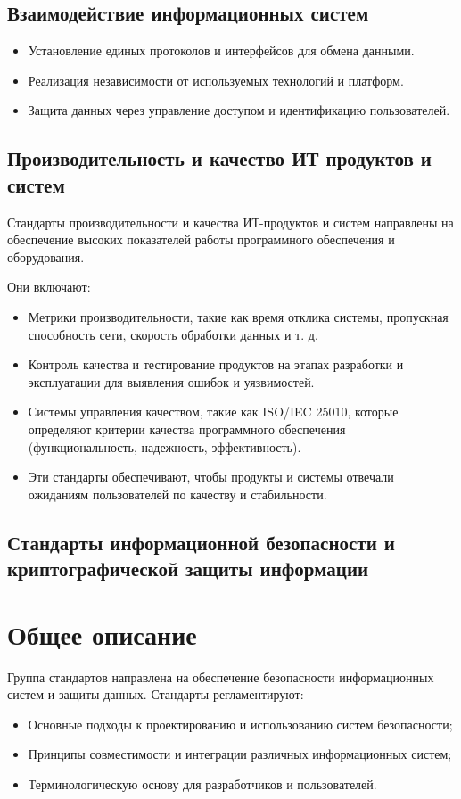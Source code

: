 \subsection*{Взаимодействие информационных систем}
\begin{itemize}
    \item Установление единых протоколов и интерфейсов для обмена данными.
    \item Реализация независимости от используемых технологий и платформ.
    \item Защита данных через управление доступом и идентификацию пользователей.
\end{itemize}
\subsection{Производительность и качество ИТ продуктов и систем}

Стандарты производительности и качества ИТ-продуктов и систем
направлены на обеспечение высоких показателей работы программного обеспечения
и оборудования.

Они включают:

\begin{itemize}
    \item Метрики производительности, такие как время отклика системы,
    пропускная способность сети, скорость обработки данных и т. д.
    \item Контроль качества и тестирование продуктов на этапах разработки
    и эксплуатации для выявления ошибок и уязвимостей.
    \item Системы управления качеством, такие как ISO/IEC 25010,
    которые определяют критерии качества программного обеспечения
    (функциональность, надежность, эффективность).
    \item Эти стандарты обеспечивают, чтобы продукты
    и системы отвечали ожиданиям пользователей по качеству и стабильности.
\end{itemize}




\subsection{Стандарты информационной безопасности и криптографической защиты информации}

\section*{Общее описание}
Группа стандартов направлена на обеспечение безопасности информационных систем и защиты данных. Стандарты регламентируют:
\begin{itemize}
    \item Основные подходы к проектированию и использованию систем безопасности;
    \item Принципы совместимости и интеграции различных информационных систем;
    \item Терминологическую основу для разработчиков и пользователей.
\end{itemize}

